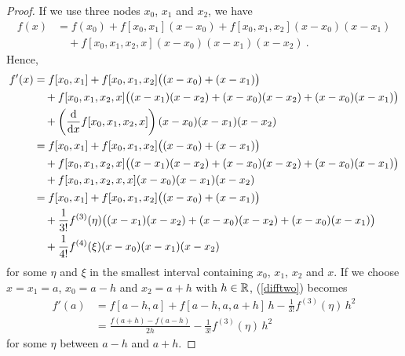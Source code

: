\begin{proof}
If we use three nodes $x_0$, $x_1$ and $x_2$, we have
\begin{align*}
f(x) &= f(x_0) + f[x_0,x_1](x-x_0) + f[x_0,x_1,x_2](x-x_0)(x-x_1) \\
 &\quad + f[x_0,x_1,x_2,x](x-x_0)(x-x_1)(x-x_2) \ .
\end{align*}
Hence,
\begin{align}
f'(x) &= f[x_0,x_1] + f[x_0,x_1,x_2]\big((x-x_0)+(x-x_1)\big) \nonumber \\
&\quad + f[x_0,x_1,x_2,x]\big((x-x_1)(x-x_2)+(x-x_0)(x-x_2)+
(x-x_0)(x-x_1)\big) \nonumber \\
&\quad + \left(\dfdx{f[x_0,x_1,x_2,x]}{x}\right)
(x-x_0)(x-x_1)(x-x_2) \nonumber \\
&= f[x_0,x_1] + f[x_0,x_1,x_2]\big((x-x_0)+(x-x_1)\big) \nonumber \\
&\quad + f[x_0,x_1,x_2,x]\big((x-x_1)(x-x_2)+(x-x_0)(x-x_2)+
(x-x_0)(x-x_1)\big) \nonumber \\
&\quad + f[x_0,x_1,x_2,x,x](x-x_0)(x-x_1)(x-x_2) \nonumber \\
&= f[x_0,x_1] + f[x_0,x_1,x_2]\big((x-x_0)+(x-x_1)\big) \nonumber \\
&\quad + \frac{1}{3!}f^{(3)}(\eta)\big((x-x_1)(x-x_2)+(x-x_0)(x-x_2)+
(x-x_0)(x-x_1)\big) \nonumber \\
&\quad + \frac{1}{4!}f^{(4)}(\xi)(x-x_0)(x-x_1)(x-x_2) \label{difftwo}
\end{align}
for some $\eta$ and $\xi$ in the smallest interval containing $x_0$,
$x_1$, $x_2$ and $x$.
If we choose $x = x_1 = a$, $x_0= a - h$ and $x_2= a + h$ with
$h \in \RR$,  (\ref{difftwo}) becomes
\begin{align*}
f'(a) &= f[a-h,a] + f[a-h,a,a+h]\,h - \frac{1}{3!}f^{(3)}(\eta)\,h^2\\
&= \frac{f(a+h)-f(a-h)}{2h} - \frac{1}{3!}f^{(3)}(\eta)\,h^2
\end{align*}
for some $\eta$ between $a-h$ and $a+h$.
\end{proof}

